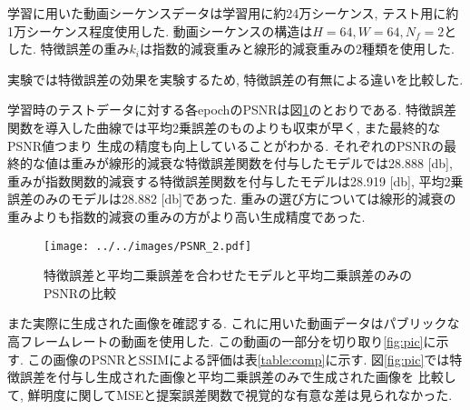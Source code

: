 \documentclass[twocolumn, a4j, uplatex]{jsarticle}
\begin{document}
学習に用いた動画シーケンスデータは学習用に約24万シーケンス, テスト用に約1万シーケンス程度使用した.
動画シーケンスの構造は$H=64, W=64, N_f=2$とした.
特徴誤差の重み$k_i$は指数的減衰重みと線形的減衰重みの2種類を使用した.

実験では特徴誤差の効果を実験するため, 特徴誤差の有無による違いを比較した.

学習時のテストデータに対する各epochのPSNRは図\ref{fig:PSNR}のとおりである.
特徴誤差関数を導入した曲線では平均2乗誤差のものよりも収束が早く, また最終的なPSNR値つまり
生成の精度も向上していることがわかる.
それぞれのPSNRの最終的な値は重みが線形的減衰な特徴誤差関数を付与したモデルでは28.888 [db],
重みが指数関数的減衰する特徴誤差関数を付与したモデルは28.919 [db],
平均2乗誤差のみのモデルは28.882 [db]であった.
重みの選び方については線形的減衰の重みよりも指数的減衰の重みの方がより高い生成精度であった.
\begin{figure}[htbp]
    \centering
    \texttt{[image: ../../images/PSNR\_2.pdf]}
    \caption{特徴誤差と平均二乗誤差を合わせたモデルと平均二乗誤差のみのPSNRの比較}
    \label{fig:PSNR}
\end{figure}




また実際に生成された画像を確認する. これに用いた動画データはパブリックな高フレームレートの動画\cite{air}を使用した.
この動画の一部分を切り取り\ref{fig:pic}に示す.
この画像のPSNRとSSIMによる評価は表\ref{table:comp}に示す.
図\ref{fig:pic}では特徴誤差を付与し生成された画像と平均二乗誤差のみで生成された画像を
比較して, 鮮明度に関してMSEと提案誤差関数で視覚的な有意な差は見られなかった.
\end{document}
